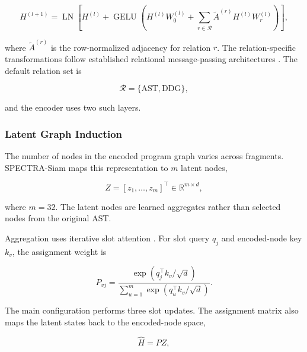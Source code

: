 \documentclass[authoryear,final,5p,times,twocolumn]{elsarticle}
\theoremstyle{plain}
\begin{document}
\begin{equation}
\label{eq:relation_encoder}
H^{(l+1)}
=
\operatorname{LN}
\left[
    H^{(l)}
    +
    \operatorname{GELU}
    \left(
        H^{(l)}W_0^{(l)}
        +
        \sum_{r\in\mathcal{R}}
        \widetilde{A}^{(r)}
        H^{(l)}W_r^{(l)}
    \right)
\right],
\end{equation}

where $\widetilde{A}^{(r)}$ is the row-normalized adjacency for relation $r$.
The relation-specific transformations follow established relational
message-passing architectures \cite{??}. The default relation set is

\begin{equation}
\mathcal{R}
=
\{
    \mathrm{AST},
    \mathrm{DDG}
\},
\end{equation}

and the encoder uses two such layers.


\subsubsection{Latent Graph Induction}
\label{sec:latent_graph_induction}

The number of nodes in the encoded program graph varies across fragments.
SPECTRA-Siam maps this representation to $m$ latent nodes,

\begin{equation}
\label{eq:latent_nodes}
Z
=
[z_1,\ldots,z_m]^{\top}
\in
\mathbb{R}^{m\times d},
\end{equation}

where $m=32$. The latent nodes are learned aggregates rather than selected
nodes from the original AST.

Aggregation uses iterative slot attention \cite{??}. For slot query $q_j$ and
encoded-node key $k_v$, the assignment weight is

\begin{equation}
\label{eq:slot_assignment}
P_{vj}
=
\frac{
    \exp
    \left(
        q_j^{\top}k_v/\sqrt{d}
    \right)
}{
    \sum_{u=1}^{m}
    \exp
    \left(
        q_u^{\top}k_v/\sqrt{d}
    \right)
}.
\end{equation}

The main configuration performs three slot updates. The assignment matrix also
maps the latent states back to the encoded-node space,

\begin{equation}
\label{eq:latent_reconstruction}
\widehat{H}
=
PZ,
\end{equation}
\end{document}

